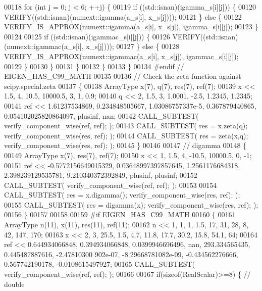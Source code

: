 \begin{DoxyCode}
00118         \textcolor{keywordflow}{for} (\textcolor{keywordtype}{int} j = 0; j < 6; ++j) \{
00119           \textcolor{keywordflow}{if} ((std::isnan)(igamma\_s[i][j])) \{
00120             VERIFY((std::isnan)(numext::igamma(a\_s[i], x\_s[j])));
00121           \} \textcolor{keywordflow}{else} \{
00122             VERIFY\_IS\_APPROX(numext::igamma(a\_s[i], x\_s[j]), igamma\_s[i][j]);
00123           \}
00124 
00125           \textcolor{keywordflow}{if} ((std::isnan)(igammac\_s[i][j])) \{
00126             VERIFY((std::isnan)(numext::igammac(a\_s[i], x\_s[j])));
00127           \} \textcolor{keywordflow}{else} \{
00128             VERIFY\_IS\_APPROX(numext::igammac(a\_s[i], x\_s[j]), igammac\_s[i][j]);
00129           \}
00130         \}
00131       \}
00132     \}
00133   \}
00134 \textcolor{preprocessor}{#endif  // EIGEN\_HAS\_C99\_MATH}
00135 
00136   \textcolor{comment}{// Check the zeta function against scipy.special.zeta}
00137   \{
00138     ArrayType x(7), q(7), res(7), ref(7);
00139     x << 1.5,   4, 10.5, 10000.5,    3, 1,        0.9;
00140     q << 2,   1.5,    3,  1.0001, -2.5, 1.2345, 1.2345;
00141     ref << 1.61237534869, 0.234848505667, 1.03086757337e-5, 0.367879440865, 0.054102025820864097, plusinf, 
      nan;
00142     CALL\_SUBTEST( verify\_component\_wise(ref, ref); );
00143     CALL\_SUBTEST( res = x.zeta(q); verify\_component\_wise(res, ref); );
00144     CALL\_SUBTEST( res = zeta(x,q); verify\_component\_wise(res, ref); );
00145   \}
00146 
00147   \textcolor{comment}{// digamma}
00148   \{
00149     ArrayType x(7), res(7), ref(7);
00150     x << 1, 1.5, 4, -10.5, 10000.5, 0, -1;
00151     ref << -0.5772156649015329, 0.03648997397857645, 1.2561176684318, 2.398239129535781, 9.210340372392849,
       plusinf, plusinf;
00152     CALL\_SUBTEST( verify\_component\_wise(ref, ref); );
00153 
00154     CALL\_SUBTEST( res = x.digamma(); verify\_component\_wise(res, ref); );
00155     CALL\_SUBTEST( res = digamma(x);  verify\_component\_wise(res, ref); );
00156   \}
00157 
00158 
00159 \textcolor{preprocessor}{#if EIGEN\_HAS\_C99\_MATH}
00160   \{
00161     ArrayType n(11), x(11), res(11), ref(11);
00162     n << 1, 1,    1, 1.5,   17,   31,   28,    8, 42, 147, 170;
00163     x << 2, 3, 25.5, 1.5,  4.7, 11.8, 17.7, 30.2, 15.8, 54.1, 64;
00164     ref << 0.644934066848, 0.394934066848, 0.0399946696496, nan, 293.334565435, 0.445487887616, -2.47810300
      902e-07, -8.29668781082e-09, -0.434562276666, 0.567742190178, -0.0108615497927;
00165     CALL\_SUBTEST( verify\_component\_wise(ref, ref); );
00166 
00167     \textcolor{keywordflow}{if}(\textcolor{keyword}{sizeof}(RealScalar)>=8) \{  \textcolor{comment}{// double}

\end{DoxyCode}
